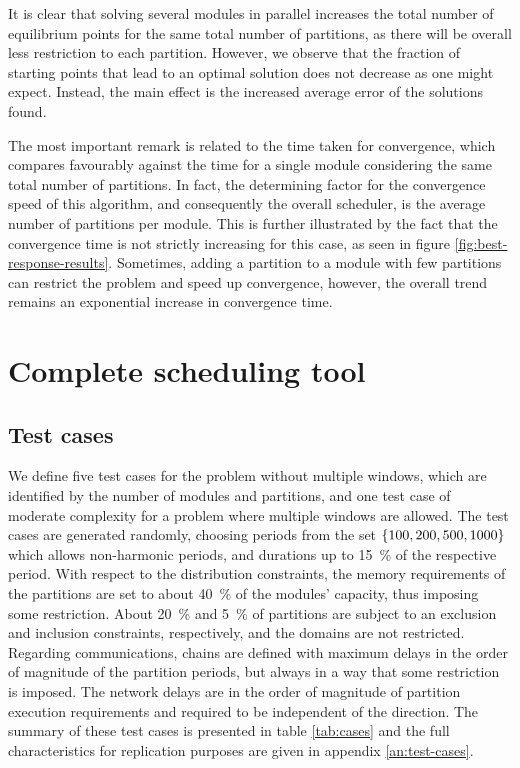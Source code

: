 \documentclass[main.tex]{subfiles}
\begin{document}

It is clear that solving several modules in parallel increases the total number of equilibrium points for the same total number of partitions, as there will be overall less restriction to each partition.
However, we observe that the fraction of starting points that lead to an optimal solution does not decrease as one might expect.
Instead, the main effect is the increased average error of the solutions found.

The most important remark is related to the time taken for convergence, which compares favourably against the time for a single module considering the same total number of partitions.
In fact, the determining factor for the convergence speed of this algorithm, and consequently the overall scheduler, is the average number of partitions per module.
This is further illustrated by the fact that the convergence time is not strictly increasing for this case, as seen in figure \ref{fig:best-response-results}.
Sometimes, adding a partition to a module with few partitions can restrict the problem and speed up convergence, however, the overall trend remains an exponential increase in convergence time.



\section{Complete scheduling tool}
\label{sec:complete-tool}

\subsection{Test cases}

We define five test cases for the problem without multiple windows, which are identified by the number of modules and partitions, and one test case of moderate complexity for a problem where multiple windows are allowed.
The test cases are generated randomly, choosing periods from the set $\{100, 200, 500, 1000\}$ which allows non-harmonic periods, and durations up to \SI{15}{\percent} of the respective period.
With respect to the distribution constraints, the memory requirements of the partitions are set to about \SI{40}{\percent} of the modules' capacity, thus imposing some restriction.
About \SI{20}{\percent} and \SI{5}{\percent} of partitions are subject to an exclusion and inclusion constraints, respectively, and the domains are not restricted.
Regarding communications, chains are defined with maximum delays in the order of magnitude of the partition periods, but always in a way that some restriction is imposed.
The network delays are in the order of magnitude of partition execution requirements and required to be independent of the direction.
The summary of these test cases is presented in table \ref{tab:cases} and the full characteristics for replication purposes are given in appendix \ref{an:test-cases}.
\end{document}
